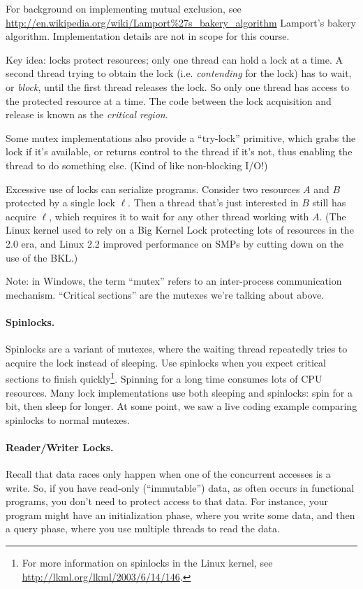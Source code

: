  For background on implementing mutual exclusion, see
 \url{http://en.wikipedia.org/wiki/Lamport\%27s_bakery_algorithm}
      {Lamport's bakery algorithm}. Implementation details are not in
      scope for this course.

Key idea: locks protect resources; only one thread
can hold a lock at a time. A second thread trying to obtain the lock
(i.e. \emph{contending} for the lock) has to wait, or \emph{block},
until the first thread releases the lock. So only one thread has
access to the protected resource at a time. The code between the lock
acquisition and release is known as the \emph{critical region}.

Some mutex implementations also provide a ``try-lock'' primitive,
which grabs the lock if it's available, or returns control to the
thread if it's not, thus enabling the thread to do something else. (Kind of
like non-blocking I/O!)

Excessive use of locks can serialize programs. Consider two resources
$A$ and $B$ protected by a single lock $\ell$. Then a thread that's
just interested in $B$ still has acquire $\ell$, which requires it to
wait for any other thread working with $A$. (The Linux kernel used to
rely on a Big Kernel Lock protecting lots of resources in the 2.0 era,
and Linux 2.2 improved performance on SMPs by cutting down on the use
of the BKL.)

Note: in Windows, the term ``mutex'' refers to an inter-process
communication mechanism. ``Critical sections'' are the mutexes we're
talking about above.

\paragraph{Spinlocks.} Spinlocks are a variant of mutexes, where the
waiting thread repeatedly tries to acquire the lock instead of sleeping.
Use spinlocks when you expect critical sections to finish 
quickly\footnote{For more information on spinlocks in the Linux
kernel, see \url{http://lkml.org/lkml/2003/6/14/146}.}. Spinning
for a long time consumes lots of CPU resources. Many lock
implementations use both sleeping and spinlocks: spin for a bit,
then sleep for longer. At some point, we saw a live coding example
comparing spinlocks to normal mutexes.

\paragraph{Reader/Writer Locks.} Recall that data races only happen when
one of the concurrent accesses is a write. So, if you have read-only
(``immutable'') data, as often occurs in functional programs, you don't need
to protect access to that data. For instance, your program might
have an initialization phase, where you write some data, and then a 
query phase, where you use multiple threads to read the data.

